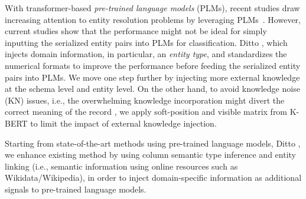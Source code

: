 With transformer-based \emph{pre-trained language models} (PLMs), recent studies draw increasing attention to entity resolution problems by leveraging PLMs~\cite{li_deep_2020, trabelsi_dame_2022}. However, current studies show that the performance might not be ideal for simply inputting the serialized entity pairs into PLMs for classification. Ditto \cite{li_deep_2020}, which injects domain information, in particular, an \emph{entity type}, and standardizes the numerical formats to improve the performance before feeding the serialized entity pairs into PLMs. We move one step further by injecting more external knowledge at the schema level and entity level. On the other hand, to avoid knowledge noise (KN) issues, i.e., the overwhelming knowledge incorporation might divert the correct meaning of the record \cite{liu_k-bert_2020}, we apply soft-position and visible matrix from K-BERT to limit the impact of external knowledge injection. 

Starting from state-of-the-art methods using pre-trained language models, Ditto \cite{li_deep_2020}, we enhance existing method by using column semantic type inference \cite{hulsebos_sherlock_2019, suhara_annotating_2022} and entity linking \cite{ayoola_refined_2022} (i.e., semantic information using online resources such as Wikidata/Wikipedia), in order to inject domain-specific information as additional signals to pre-trained language models. 


    
